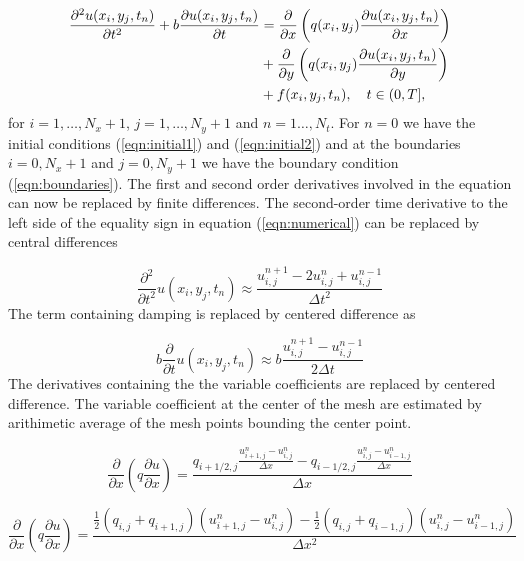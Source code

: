 \documentclass[twoside]{article}
\begin{document}
\begin{align} \notag
\frac{\partial^2u(x_i,y_j,t_n)}{\partial t^2} +b\frac{\partial u(x_i,y_j,t_n)}{\partial t} &= \frac{\partial}{\partial x}\left(q(x_i,y_j)\frac{\partial u(x_i,y_j,t_n)}{\partial x} \right) \\ \notag
&+\frac{\partial}{\partial y}\left(q(x_i,y_j)\frac{\partial u(x_i,y_j,t_n)}{\partial y} \right)\\                                                                                           &+ f(x_i,y_j,t_n), \quad t \in (0,T], \label{eqn:numerical}
\end{align}
for $i=1,\dots , N_x+1$, $j=1,\dots , N_y+1$ and $n=1 \dots ,N_t$. For $n=0$ we have the initial conditions (\ref{eqn:initial1}) and (\ref{eqn:initial2}) and at the boundaries $i=0, N_x+1$ and $j=0,N_y+1$ we have the boundary condition (\ref{eqn:boundaries}). The first and second order derivatives involved in the equation can now be replaced by finite differences. The second-order time derivative to the left side of the equality sign in equation (\ref{eqn:numerical}) can be replaced by central differences

\begin{equation}
 \frac{\partial^2}{\partial t^2}u(x_{i}, y_{j},t_n)\approx\frac{u_{i,j}^{n+1}-2u_{i,j}^n+u_{i,j}^{n-1}}{\Delta t^2}
\label{eqn:doublt}
\end{equation}
The term containing damping is replaced by centered difference as

\begin{equation}
 b\frac{\partial}{\partial t}u(x_i,y_j,t_n)\approx b\frac{u_{i,j}^{n+1}-u_{i,j}^{n-1}}{2\Delta t}
\label{eqn:damping}
\end{equation}
The derivatives containing the the variable coefficients are replaced by centered difference. The variable coefficient at the center of the mesh are estimated by arithimetic average of the mesh points bounding the center point.

 \begin{equation}
\frac{\partial}{\partial x}(q\frac{\partial u}{\partial x})=\frac{q_{i+1/2,j}\frac{u_{i+1,j}^n-u_{i,j}^n}{\Delta x}-q_{i-1/2,j}\frac{u_{i,j}^n-u_{i-1,j}^n}{\Delta x}}{\Delta x}
\label{eqn:variablex1}
\end{equation}

 \begin{equation}
\frac{\partial}{\partial x}(q\frac{\partial u}{\partial x})=\frac{\frac{1}{2}(q_{i,j}+q_{i+1,j})(u_{i+1,j}^n-u_{i,j}^n)-\frac{1}{2}(q_{i,j}+q_{i-1,j})(u_{i,j}^n-u_{i-1,j}^n)}{\Delta x^2}
\label{eqn:variablex2}
\end{equation}
\end{document}
